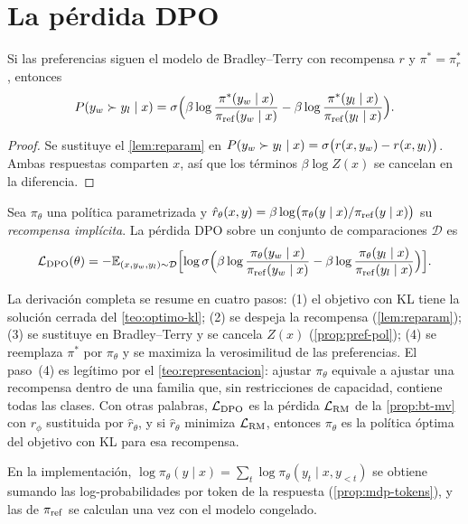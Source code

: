 \section{La pérdida DPO}

\begin{proposicion}\label{prop:pref-pol}
Si las preferencias siguen el modelo de Bradley--Terry con recompensa $r$ y $\pi^{*}=\pi^{*}_r$, entonces
\[
P(y_w\succ y_l\mid x)=\sigma\Bigl(\beta\log\frac{\pi^{*}(y_w\mid x)}{\pi_{\mathrm{ref}}(y_w\mid x)}-\beta\log\frac{\pi^{*}(y_l\mid x)}{\pi_{\mathrm{ref}}(y_l\mid x)}\Bigr).
\]
\end{proposicion}

\begin{proof}
Se sustituye el \cref{lem:reparam} en $P(y_w\succ y_l\mid x)=\sigma\bigl(r(x,y_w)-r(x,y_l)\bigr)$. Ambas respuestas comparten $x$, así que los términos $\beta\log Z(x)$ se cancelan en la diferencia.
\end{proof}

\begin{definicion}\label{def:dpo}
Sea $\pi_\theta$ una política parametrizada y $\hat r_\theta(x,y)=\beta\log\bigl(\pi_\theta(y\mid x)/\pi_{\mathrm{ref}}(y\mid x)\bigr)$ su \emph{recompensa implícita}. La pérdida DPO sobre un conjunto de comparaciones $\mathcal{D}$ es
\[
\mathcal{L}_{\mathrm{DPO}}(\theta)=-\mathbb{E}_{(x,y_w,y_l)\sim\mathcal{D}}\Bigl[\log\sigma\Bigl(\beta\log\frac{\pi_\theta(y_w\mid x)}{\pi_{\mathrm{ref}}(y_w\mid x)}-\beta\log\frac{\pi_\theta(y_l\mid x)}{\pi_{\mathrm{ref}}(y_l\mid x)}\Bigr)\Bigr].
\]
\end{definicion}

La derivación completa se resume en cuatro pasos: (1) el objetivo con KL tiene la solución cerrada del \cref{teo:optimo-kl}; (2) se despeja la recompensa (\cref{lem:reparam}); (3) se sustituye en Bradley--Terry y se cancela $Z(x)$ (\cref{prop:pref-pol}); (4) se reemplaza $\pi^{*}$ por $\pi_\theta$ y se maximiza la verosimilitud de las preferencias. El paso~(4) es legítimo por el \cref{teo:representacion}: ajustar $\pi_\theta$ equivale a ajustar una recompensa dentro de una familia que, sin restricciones de capacidad, contiene todas las clases. Con otras palabras, $\mathcal{L}_{\mathrm{DPO}}$ es la pérdida $\mathcal{L}_{\mathrm{RM}}$ de la \cref{prop:bt-mv} con $r_\phi$ sustituida por $\hat r_\theta$, y si $\hat r_\theta$ minimiza $\mathcal{L}_{\mathrm{RM}}$, entonces $\pi_\theta$ es la política óptima del objetivo con KL para esa recompensa.

En la implementación, $\log\pi_\theta(y\mid x)=\sum_t\log\pi_\theta(y_t\mid x,y_{<t})$ se obtiene sumando las log-probabilidades por token de la respuesta (\cref{prop:mdp-tokens}), y las de $\pi_{\mathrm{ref}}$ se calculan una vez con el modelo congelado.

